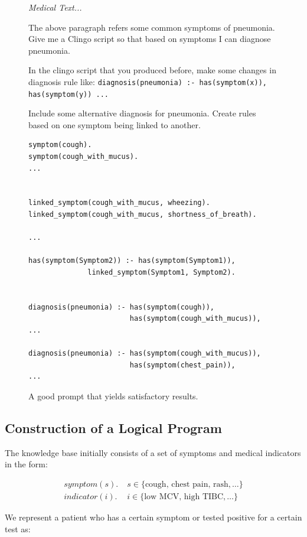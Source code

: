 \documentclass[10pt,leqno]{amsart}
\newcommand{\src}[1]{\texttt{#1}}
\newenvironment{commandline}{
	\medskip
	\begin{mdframed}[style=commandline]
}{
	\end{mdframed}
	\medskip
}
\newenvironment{prompt}[1][Prompt:]{ %
	\medskip
	\begin{mdframed}[style=warning]
		\noindent{\textbf{#1}}
}{
	\end{mdframed}
}
\begin{document}
\begin{figure}[!h]
\begin{prompt}
\textit{Medical Text...}

The above paragraph refers some common symptoms of pneumonia.
Give me a Clingo script so that based on symptoms I can diagnose pneumonia.

In the clingo script that you produced before, make some changes in diagnosis rule like:
\src{diagnosis(pneumonia) :- has(symptom(x)), has(symptom(y)) ...}

Include some alternative diagnosis for pneumonia.
Create rules based on one symptom being linked to another.
\end{prompt}


\begin{commandline}
\scriptsize
\begin{verbatim}
symptom(cough).
symptom(cough_with_mucus).
...


linked_symptom(cough_with_mucus, wheezing).
linked_symptom(cough_with_mucus, shortness_of_breath).

...

has(symptom(Symptom2)) :- has(symptom(Symptom1)), 
              linked_symptom(Symptom1, Symptom2).


diagnosis(pneumonia) :- has(symptom(cough)),
                        has(symptom(cough_with_mucus)),
...

diagnosis(pneumonia) :- has(symptom(cough_with_mucus)),
                        has(symptom(chest_pain)),
...
\end{verbatim}
\end{commandline}
\caption{A good prompt that yields satisfactory results.}
\label{fig:good-prompt}
\end{figure}

\subsection{Construction of a Logical Program}

The knowledge base initially consists of a set of symptoms and medical indicators in the form:

\begin{align}
    symptom(s). & \; s \in \{ \text{cough, chest pain, rash}, \dots \} \\
    indicator(i). & \; i \in \{ \text{low MCV, high TIBC}, \dots \}
\end{align}

We represent a patient who has a certain symptom or tested positive for a certain test as:
\end{document}
